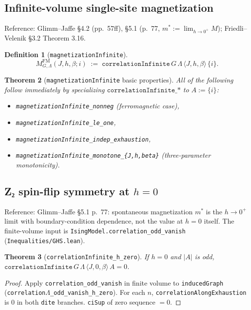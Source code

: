\documentclass[a4paper,11pt]{article}
\newtheorem{theorem}{Theorem}
\newtheorem{definition}[theorem]{Definition}
\newcommand{\LeanLambda}{\texorpdfstring{\ensuremath{\Lambda}}{Lambda}}
\begin{document}
\subsection{Infinite-volume single-site magnetization}

Reference: Glimm--Jaffe \S 4.2 (pp.\ 57ff), \S 5.1
(p.\ 77, $m^* := \lim_{h \to 0^+} M$);
Friedli--Velenik \S 3.2 Theorem 3.16.

\begin{definition}[\texttt{magnetizationInfinite}]
\[
M^{\mathrm{FM}}_{G,\Lambda}(J, h, \beta; i)
  \;:=\; \texttt{correlationInfinite}\,G\,\Lambda\,\langle J,h,\beta\rangle\,\{i\}.
\]
\end{definition}

\begin{theorem}[\texttt{magnetizationInfinite} basic properties]
All of the following follow immediately by specializing
$\texttt{correlationInfinite\_*}$ to $A := \{i\}$:
\begin{itemize}
\item \texttt{magnetizationInfinite\_nonneg} (ferromagnetic case),
\item \texttt{magnetizationInfinite\_le\_one},
\item \texttt{magnetizationInfinite\_indep\_exhaustion},
\item \texttt{magnetizationInfinite\_monotone\_\{J,h,beta\}} (three-parameter monotonicity).
\end{itemize}
\end{theorem}

\subsection*{Z₂ spin-flip symmetry at $h = 0$}

Reference: Glimm--Jaffe \S 5.1 p.\ 77: spontaneous magnetization $m^*$ is
the $h \to 0^+$ limit with boundary-condition dependence, not the value at
$h = 0$ itself. The finite-volume input is
\texttt{IsingModel.correlation\_odd\_vanish} (\texttt{Inequalities/GHS.lean}).

\begin{theorem}[\texttt{correlationInfinite\_h\_zero}]
If $h = 0$ and $|A|$ is odd,
$\texttt{correlationInfinite}\,G\,\Lambda\,\langle J,0,\beta\rangle\,A = 0$.
\end{theorem}

\begin{proof}
Apply \texttt{correlation\_odd\_vanish} in finite volume to
\texttt{inducedGraph} (\texttt{correlation\LeanLambda\_odd\_vanish\_h\_zero}). For
each $n$, \texttt{correlationAlongExhaustion} is 0 in both \texttt{dite}
branches.
\texttt{ciSup} of zero sequence $= 0$.
\end{proof}
\end{document}
